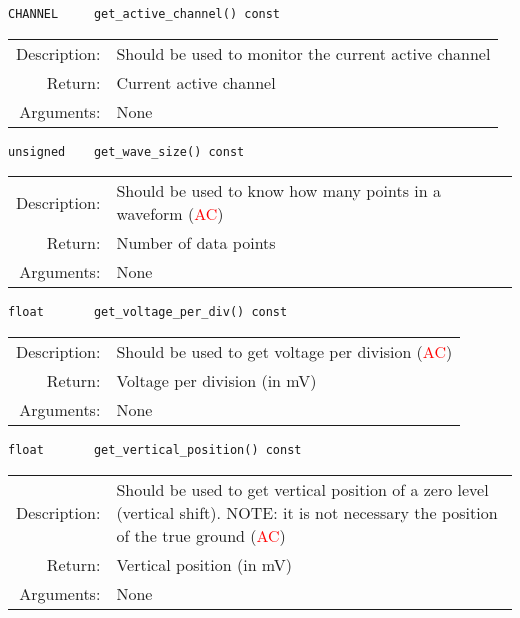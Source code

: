 \begin{lstlisting}
CHANNEL     get_active_channel() const
\end{lstlisting}
\begin{tabularx}{\textwidth}{rp{11cm}}
    \toprule
    Description: & Should be used to monitor the current active channel\\
    Return: & Current active channel\\
    Arguments: & None\\
    \bottomrule
\end{tabularx}
\vspace{1cm}

\begin{lstlisting}
unsigned    get_wave_size() const
\end{lstlisting}
\begin{tabularx}{\textwidth}{rp{11cm}}
    \toprule
    Description: & Should be used to know how many points in a waveform (\textcolor{red}{AC})\\
    Return: & Number of data points\\
    Arguments: & None\\
    \bottomrule
\end{tabularx}
\vspace{1cm}

\begin{lstlisting}
float       get_voltage_per_div() const
\end{lstlisting}
\begin{tabularx}{\textwidth}{rp{11cm}}
    \toprule
    Description: & Should be used to get voltage per division (\textcolor{red}{AC})\\
    Return: & Voltage per division (in mV)\\
    Arguments: & None\\
    \bottomrule
\end{tabularx}
\vspace{1cm}

\begin{lstlisting}
float       get_vertical_position() const
\end{lstlisting}
\begin{tabularx}{\textwidth}{rp{11cm}}
    \toprule
    Description: & Should be used to get vertical position of a zero level (vertical shift). NOTE: it is not necessary the position of the true ground (\textcolor{red}{AC})\\
    Return: & Vertical position (in mV)\\
    Arguments: & None\\
    \bottomrule
\end{tabularx}
\vspace{1cm}

